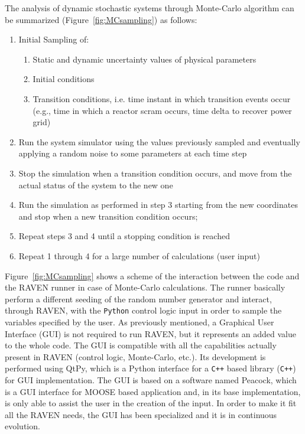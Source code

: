 \documentclass{mc2013}
\begin{document}
The analysis of dynamic stochastic systems through Monte-Carlo algorithm can be summarized (Figure~\ref{fig:MCsampling}) as follows:
\begin{enumerate}
\item Initial Sampling of:
       \begin{enumerate}
       \item Static and dynamic uncertainty values of physical parameters
       \item Initial conditions
       \item Transition conditions, i.e. time instant in which transition events occur (e.g., time in which a reactor scram occurs, time delta to recover power grid)
    \end{enumerate}
\item Run the system simulator using the values previously sampled and eventually applying a random noise to some parameters at each time step
\item Stop the simulation when a transition condition occurs, and move from the actual status of the system   to the new one
\item Run the simulation as performed in step 3 starting from the new coordinates and stop when a new transition condition occurs;
\item Repeat steps 3 and 4 until a stopping condition is reached
\item Repeat 1 through 4 for a large number of calculations (user input)
\end{enumerate}
Figure~\ref{fig:MCsampling} shows a scheme of the interaction between the code and the RAVEN runner in case of Monte-Carlo calculations. The runner basically perform a different seeding of the random number generator and interact, through RAVEN, with the \verb!Python! control logic input in order to sample the variables specified by the user.
\label{sec:GUI}
As previously mentioned, a Graphical User Interface (GUI) is not required to run RAVEN, but it represents an added value to the whole code. The GUI is compatible with all the capabilities actually present in RAVEN (control logic, Monte-Carlo, etc.).  Its development is performed using QtPy, which is a Python interface for a \verb!C++! based library (\verb!C++!) for GUI implementation. The GUI is based on a software named Peacock, which is a GUI interface for MOOSE based application and, in its base implementation, is only able to assist the user in the creation of the input.  In order to make it fit all the RAVEN needs, the GUI has been specialized and it is in continuous evolution. 
\end{document}
